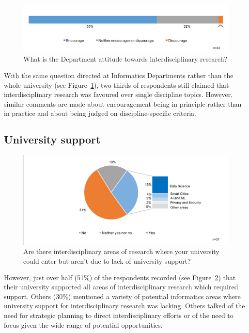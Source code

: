 \begin{figure}[h]
\centering
\includegraphics[width = \linewidth]{charts/1b.png}
\caption{What is the Department attitude towards interdisciplinary research?}
\label{sect1:Dattitude}
\end{figure}

With the same question directed at Informatics Departments rather than the whole university (see Figure~\ref{sect1:Dattitude}), two thirds of respondents still claimed that interdisciplinary research was favoured over single discipline topics. However, similar comments are made about encouragement being in principle rather than in practice and about being judged on discipline-specific criteria.

\subsection{University support}

\begin{figure}[h]
\centering
\includegraphics[width = \linewidth]{charts/1c.png}
\caption{Are there interdisciplinary areas of research where your university
could enter but aren't due to lack of university support?}
\label{sect1:support}
\end{figure}

However, just over half (51\%) of the respondents recorded (see Figure~\ref{sect1:support}) that their university supported all areas of interdisciplinary research which required  support. Others (30\%) mentioned a variety of potential informatics areas where university support for interdisciplinary research was lacking. Others talked of the need for strategic planning to direct interdisciplinary efforts or of the need to focus given the wide range of potential opportunities.

